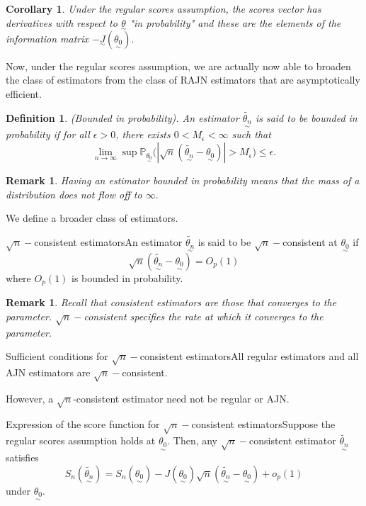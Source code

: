 \documentclass[twoside]{article}
\newtheorem{corollary}[theorem]{Corollary}
\newtheorem{definition}[theorem]{Definition}
\newtheorem{remark}[theorem]{Remark}
\newcommand{\prob}{\mathbb{P}}
\newcommand{\utilde}{\underset{\sim}}
\begin{document}
\begin{corollary}Under the regular scores assumption, the scores vector has derivatives with respect to $\utilde{\theta}$ "in probability" and these are the elements of the information matrix $-\utilde{J}(\utilde{\theta_0}).$
\end{corollary}

Now, under the regular scores assumption, we are actually now able to broaden the class of estimators  from the class of RAJN estimators that are asymptotically efficient.

\begin{definition}(Bounded in probability). An estimator $\tilde{\utilde{\theta_n}}$ is said to be bounded in probability if for all $\epsilon > 0$, there exists $0 < M_{\epsilon} < \infty$ such that 
$$
\lim_{n \rightarrow \infty}\sup \prob_{\utilde{\theta_0}}\bigg(|\sqrt{n}(\tilde{\utilde{\theta_n}} - \utilde{\theta_0})| > M_{\epsilon} \bigg) \leq \epsilon.
$$
\end{definition}

\begin{remark}Having an estimator bounded in probability means that the mass of a distribution does not flow off to $\infty.$
\end{remark}

We define a broader class of estimators.

\begin{definition_exam}{$\sqrt{n}-$consistent estimators}{}An estimator $\tilde{\utilde{\theta_n}}$ is said to be $\sqrt{n}-$consistent at $\utilde{\theta_0}$ if 
$$
\sqrt{n}(\tilde{\utilde{\theta_n}} - \utilde{\theta_0}) = O_p(1)
$$
where $O_p(1)$ is bounded in probability.
\end{definition_exam}

\begin{remark}Recall that consistent estimators are those that converges to the parameter. $\sqrt{n}-$consistent specifies the rate at which it converges to the parameter.
\end{remark}

\begin{proposition_exam}{Sufficient conditions for $\sqrt{n}-$consistent estimators}{}All regular estimators and all AJN estimators are $\sqrt{n}-$consistent.
\end{proposition_exam}

However, a $\sqrt{n}$-consistent estimator need not be regular or AJN.

\begin{theorem_exam}{Expression of the score function for $\sqrt{n}-$consistent estimators}{}Suppose the regular scores assumption holds at $\utilde{\theta_0}.$ Then, any $\sqrt{n}-$consistent estimator $\tilde{\utilde{\theta_n}}$ satisfies 
$$
S_n(\tilde{\utilde{\theta_n}}) = S_n(\utilde{\theta_0}) - J(\utilde{\theta_0})\sqrt{n}(\tilde{\utilde{\theta_n}} - \utilde{\theta_0}) + o_p(1)
$$
under $\utilde{\theta_0}.$
\end{theorem_exam}
\end{document}
